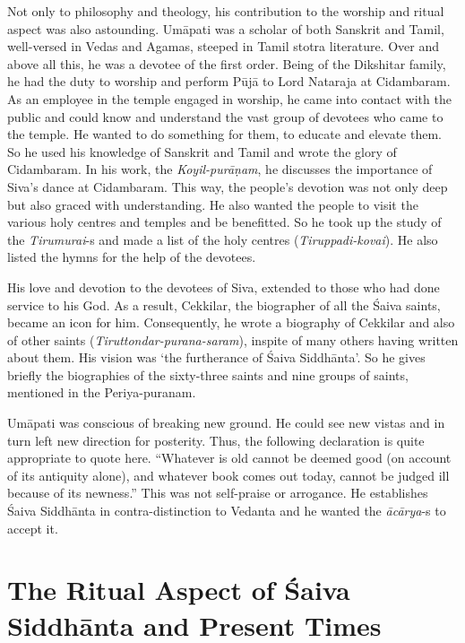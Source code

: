 Not only to philosophy and theology, his contribution to the worship and ritual aspect was also astounding. Umāpati was a scholar of both Sanskrit and Tamil, well-versed in Vedas and Agamas, steeped in Tamil stotra literature. Over and above all this, he was a devotee of the first order. Being of the Dikshitar family, he had the duty to worship and perform Pūjā to Lord Nataraja at Cidambaram. As an employee in the temple engaged in worship, he came into contact with the public and could know and understand the vast group of devotees who came to the temple. He wanted to do something for them, to educate and elevate them. So he used his knowledge of Sanskrit and Tamil and wrote the glory of Cidambaram. In his work, the \textit{Koyil-purāṇam}, he discusses the importance of Siva’s dance at Cidambaram. This way, the people’s devotion was not only deep but also graced with understanding. He also wanted the people to visit the various holy centres and temples and be benefitted. So he took up the study of the \textit{Tirumurai}-s and made a list of the holy centres (\textit{Tiruppadi-kovai}). He also listed the hymns for the help of the devotees.

His love and devotion to the devotees of Siva, extended to those who had done service to his God. As a result, Cekkilar, the biographer of all the Śaiva saints, became an icon for him. Consequently, he wrote a biography of Cekkilar and also of other saints (\textit{Tiruttondar-purana-saram}), inspite of many others having written about them. His vision was ‘the furtherance of Śaiva Siddhānta’. So he gives briefly the biographies of the sixty-three saints and nine groups of saints, mentioned in the Periya-puranam.

Umāpati was conscious of breaking new ground. He could see new vistas and in turn left new direction for posterity. Thus, the following declaration is quite appropriate to quote here. “Whatever is old cannot be deemed good (on account of its antiquity alone), and whatever book comes out today, cannot be judged ill because of its newness.” This was not self-praise or arrogance. He establishes Śaiva Siddhānta in contra-distinction to Vedanta and he wanted the \textit{ācārya}-s to accept it.


\section*{The Ritual Aspect of Śaiva Siddhānta and Present Times}

